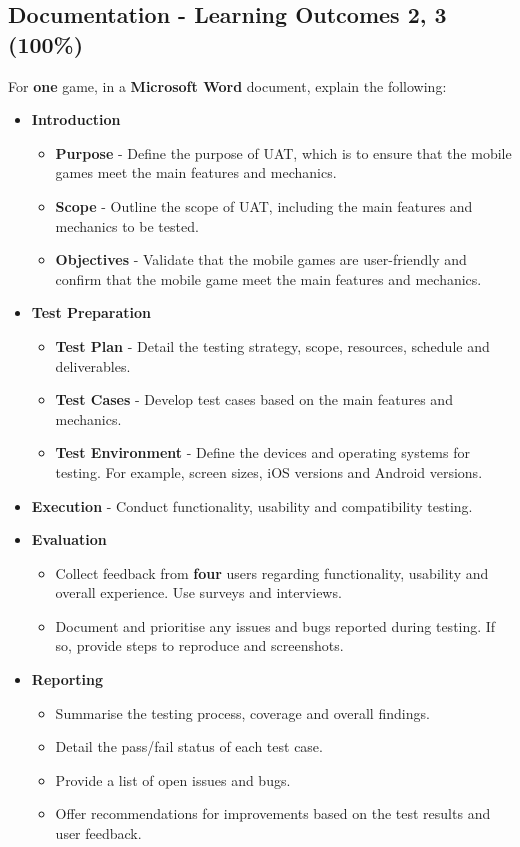 \documentclass{article}
\begin{document}
\subsection*{Documentation - Learning Outcomes 2, 3 (100\%)}
For \textbf{one} game, in a \textbf{Microsoft Word} document, explain the following:
\begin{itemize}
    \item \textbf{Introduction} 
    \begin{itemize}
        \item \textbf{Purpose} - Define the purpose of UAT, which is to ensure that the mobile games meet the main features and mechanics.
        \item \textbf{Scope} - Outline the scope of UAT, including the main features and mechanics to be tested.
        \item \textbf{Objectives} - Validate that the mobile games are user-friendly and confirm that the mobile game  meet the main features and mechanics.
    \end{itemize}

    \item \textbf{Test Preparation}
    \begin{itemize}
        \item \textbf{Test Plan} - Detail the testing strategy, scope, resources, schedule and deliverables.
        \item \textbf{Test Cases} - Develop test cases based on the main features and mechanics.
        \item \textbf{Test Environment} - Define the devices and operating systems for testing. For example, screen sizes, iOS versions and Android versions.
    \end{itemize}
    
    \item \textbf{Execution} - Conduct functionality, usability and compatibility testing.

    \item \textbf{Evaluation}
    \begin{itemize}
        \item Collect feedback from \textbf{four} users regarding functionality, usability and overall experience. Use surveys and interviews.
        \item Document and prioritise any issues and bugs reported during testing. If so, provide steps to reproduce and screenshots.
    \end{itemize}

    \item \textbf{Reporting}
    \begin{itemize}
        \item Summarise the testing process, coverage and overall findings.
        \item Detail the pass/fail status of each test case.
        \item Provide a list of open issues and bugs.
        \item Offer recommendations for improvements based on the test results and user feedback.
    \end{itemize}

\end{itemize}
\end{document}
